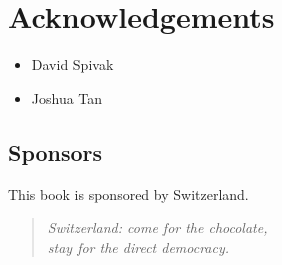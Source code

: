 
\section{Acknowledgements}

\begin{itemize}
    \item David Spivak
    \item Joshua Tan
\end{itemize}


\vfill

\subsection{Sponsors}

This book is sponsored by Switzerland.

\begin{quote}
    \itshape
    Switzerland: come for the chocolate,\\
    stay for the direct democracy.
\end{quote}


